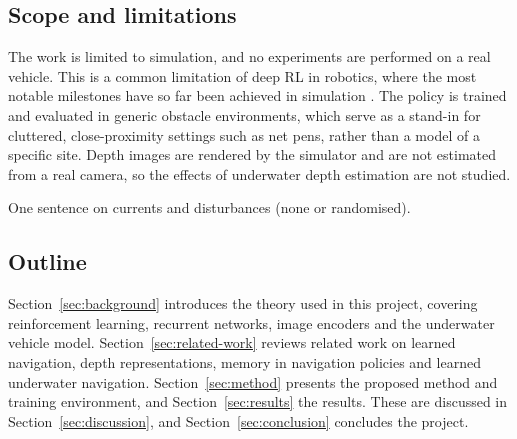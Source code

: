 \subsection{Scope and limitations}
\label{sec:scope}
The work is limited to simulation, and no experiments are performed on a real vehicle. This is a common limitation of deep RL in robotics, where the most notable milestones have so far been achieved in simulation \parencite{tang2025deep}. The policy is trained and evaluated in generic obstacle environments, which serve as a stand-in for cluttered, close-proximity settings such as net pens, rather than a model of a specific site. Depth images are rendered by the simulator and are not estimated from a real camera, so the effects of underwater depth estimation are not studied.
\begin{todolist}
  \item One sentence on currents and disturbances (none or randomised).
\end{todolist}

\subsection{Outline}
\label{sec:outline}
Section~\ref{sec:background} introduces the theory used in this project, covering reinforcement learning, recurrent networks, image encoders and the underwater vehicle model. Section~\ref{sec:related-work} reviews related work on learned navigation, depth representations, memory in navigation policies and learned underwater navigation. Section~\ref{sec:method} presents the proposed method and training environment, and Section~\ref{sec:results} the results. These are discussed in Section~\ref{sec:discussion}, and Section~\ref{sec:conclusion} concludes the project.
